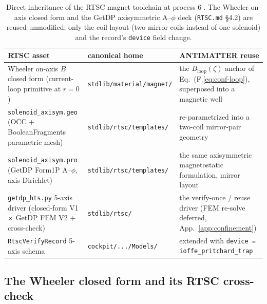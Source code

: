 \begin{table}[h]
\centering
\small
\setlength{\tabcolsep}{5pt}
\begin{tabular}{@{}>{\raggedright\arraybackslash}m{4.0cm} >{\raggedright\arraybackslash}m{4.3cm} >{\raggedright\arraybackslash}m{3.6cm}@{}}
\toprule
\textbf{RTSC asset} & \textbf{canonical home} & \textbf{ANTIMATTER reuse} \\
\midrule
Wheeler on-axis $B$ closed form (current-loop primitive at $r=0$) &
\texttt{stdlib/material/magnet/} &
the $B_{\mathrm{loop}}(\zeta)$ anchor of Eq.~(F.\ref{eq:conf-loop}),
superposed into a magnetic well \\[3pt]
\texttt{solenoid\_axisym.geo} (OCC + BooleanFragments parametric mesh) &
\texttt{stdlib/rtsc/templates/} &
re-parametrized into a two-coil mirror-pair geometry \\[3pt]
\texttt{solenoid\_axisym.pro} (GetDP Form1P A--$\phi$, axis Dirichlet) &
\texttt{stdlib/rtsc/templates/} &
the same axisymmetric magnetostatic formulation, mirror layout \\[3pt]
\texttt{getdp\_hts.py} 5-axis driver (closed-form V1 $\times$ GetDP FEM V2 + cross-check) &
\texttt{stdlib/rtsc/} &
the verify-once / reuse driver (FEM re-solve deferred, App.~\ref{app:confinement}) \\[3pt]
\texttt{RtscVerifyRecord} 5-axis schema &
\texttt{cockpit/.../Models/} &
extended with \texttt{device = ioffe\_pritchard\_trap} \\
\bottomrule
\end{tabular}
\caption{Direct inheritance of the RTSC magnet toolchain at process
\textcircled{\scriptsize 6}. The Wheeler on-axis closed form and the GetDP
axisymmetric A--$\phi$ deck (\texttt{RTSC.md} \S4.2) are reused unmodified;
only the coil layout (two mirror coils instead of one solenoid) and the
record's \texttt{device} field change.}
\label{tab:rtsc-assets}
\end{table}

\subsection{The Wheeler closed form and its RTSC cross-check}
\label{app:rtsc-wheeler}

